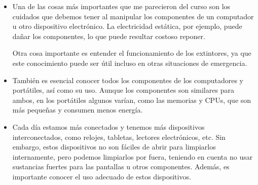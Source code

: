 \documentclass{article}
\begin{document}
\begin{itemize}
\item Una de las cosas más importantes que me parecieron del curso son los
cuidados que debemos tener al manipular los componentes de un
computador u otro dispositivo electrónico. La electricidad estática,
por ejemplo, puede dañar los componentes, lo que puede resultar
costoso reponer.

Otra cosa importante es entender el funcionamiento de los
extintores, ya que este conocimiento puede ser útil incluso en otras
situaciones de emergencia.

\item También es esencial conocer todos los componentes de los
computadores y portátiles, así como su uso. Aunque los componentes
son similares para ambos, en los portátiles algunos varían, como las
memorias y CPUs, que son más pequeñas y consumen menos energía.

\item Cada día estamos más conectados y tenemos más dispositivos
interconectados, como relojes, tabletas, lectores electrónicos,
etc. Sin embargo, estos dispositivos no son fáciles de abrir para
limpiarlos internamente, pero podemos limpiarlos por fuera, teniendo
en cuenta no usar sustancias fuertes para las pantallas u otros
componentes. Además, es importante conocer el uso adecuado de estos
dispositivos.
\end{itemize}
\end{document}
